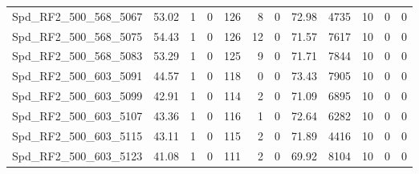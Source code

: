 \begin{longtable}[c]{@{}lrrrrrrrrrrr@{}}
Spd\_RF2\_500\_568\_5067     & 53.02                  & 1                       & 0                       & 126                    & 8                       & 0                       & 72.98                   & 4735                     & 10                       & 0                        & 0                        \\
Spd\_RF2\_500\_568\_5075     & 54.43                  & 1                       & 0                       & 126                    & 12                      & 0                       & 71.57                   & 7617                     & 10                       & 0                        & 0                        \\
Spd\_RF2\_500\_568\_5083     & 53.29                  & 1                       & 0                       & 125                    & 9                       & 0                       & 71.71                   & 7844                     & 10                       & 0                        & 0                        \\
Spd\_RF2\_500\_603\_5091     & 44.57                  & 1                       & 0                       & 118                    & 0                       & 0                       & 73.43                   & 7905                     & 10                       & 0                        & 0                        \\
Spd\_RF2\_500\_603\_5099     & 42.91                  & 1                       & 0                       & 114                    & 2                       & 0                       & 71.09                   & 6895                     & 10                       & 0                        & 0                        \\
Spd\_RF2\_500\_603\_5107     & 43.36                  & 1                       & 0                       & 116                    & 1                       & 0                       & 72.64                   & 6282                     & 10                       & 0                        & 0                        \\
Spd\_RF2\_500\_603\_5115     & 43.11                  & 1                       & 0                       & 115                    & 2                       & 0                       & 71.89                   & 4416                     & 10                       & 0                        & 0                        \\
Spd\_RF2\_500\_603\_5123     & 41.08                  & 1                       & 0                       & 111                    & 2                       & 0                       & 69.92                   & 8104                     & 10                       & 0                        & 0                        \\

\end{longtable}
